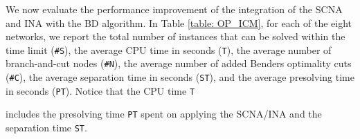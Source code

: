 \documentclass[a4paper,10pt]{article}
\newcommand{\maxlength}{\mathbf{MaxReacSize}}
\theoremstyle{plain}
\newcommand{\revv}[1]{{#1}}
\newcommand{\sharpS}{{\texttt{\#S}}\xspace}
\newcommand{\Time}{{\texttt{T}}\xspace}
\newcommand{\sharpN}{{\texttt{\#}{\texttt{N}}}\xspace}
\newcommand{\sharpC}{{\texttt{\#}{\texttt{C}}}\xspace}
\newcommand{\PTime}{{\texttt{PT}}\xspace}
\newcommand{\SepaTime}{{\texttt{ST}}\xspace}
\begin{document}
{	%
	
	
	
	We now evaluate the performance improvement of  the integration of the SCNA and INA with the BD algorithm.
	In Table \ref{table: OP_ICM}, for each of the eight networks, we report the total number of instances that can be solved within the time limit (\sharpS), the average CPU time in seconds (\Time), the average number of  \revv{branch-and-cut nodes}  (\sharpN),
	the average number of added Benders optimality cuts (\sharpC), \revv{the average separation time in seconds (\SepaTime), and the average presolving time in seconds (\PTime)}.
	Notice that the CPU time \Time} includes the presolving time \PTime spent on applying the SCNA/INA \revv{and the separation time \SepaTime}.
\end{document}
